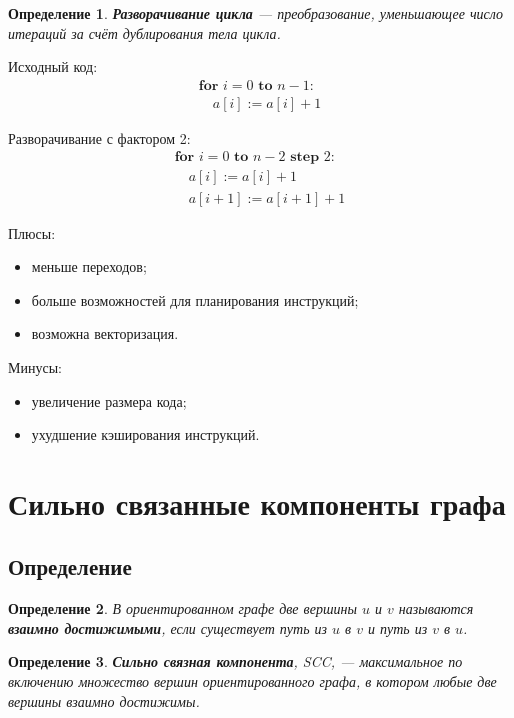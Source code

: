 \documentclass[12pt,a4paper]{article}
\newtheorem{definition}{Определение}
\begin{document}
\begin{definition}
\textbf{Разворачивание цикла} --- преобразование, уменьшающее число итераций за счёт дублирования тела цикла.
\end{definition}

Исходный код:
\[
\begin{array}{l}
\textbf{for } i=0 \textbf{ to } n-1:\\
\quad a[i] := a[i]+1
\end{array}
\]

Разворачивание с фактором 2:
\[
\begin{array}{l}
\textbf{for } i=0 \textbf{ to } n-2 \textbf{ step } 2:\\
\quad a[i] := a[i]+1\\
\quad a[i+1] := a[i+1]+1
\end{array}
\]

Плюсы:
\begin{itemize}
    \item меньше переходов;
    \item больше возможностей для планирования инструкций;
    \item возможна векторизация.
\end{itemize}

Минусы:
\begin{itemize}
    \item увеличение размера кода;
    \item ухудшение кэширования инструкций.
\end{itemize}

\section{Сильно связанные компоненты графа}

\subsection{Определение}

\begin{definition}
В ориентированном графе две вершины $u$ и $v$ называются \textbf{взаимно достижимыми}, если существует путь из $u$ в $v$ и путь из $v$ в $u$.
\end{definition}

\begin{definition}
\textbf{Сильно связная компонента}, SCC, --- максимальное по включению множество вершин ориентированного графа, в котором любые две вершины взаимно достижимы.
\end{definition}
\end{document}
